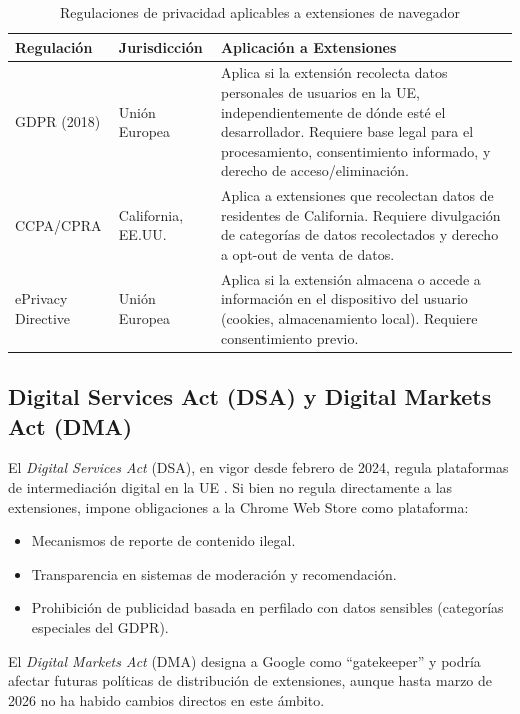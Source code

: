 \documentclass[12pt,oneside]{report}
\begin{document}
\begin{table}[!htbp]
\centering
\small
\begin{tabularx}{\textwidth}{|l|l|X|}
\hline
\textbf{Regulación} & \textbf{Jurisdicción} & \textbf{Aplicación a Extensiones} \\
\hline
GDPR (2018) & Unión Europea & Aplica si la extensión recolecta datos personales de usuarios en la UE, independientemente de dónde esté el desarrollador. Requiere base legal para el procesamiento, consentimiento informado, y derecho de acceso/eliminación. \\
\hline
CCPA/CPRA & California, EE.UU. & Aplica a extensiones que recolectan datos de residentes de California. Requiere divulgación de categorías de datos recolectados y derecho a opt-out de venta de datos. \\
\hline
ePrivacy Directive & Unión Europea & Aplica si la extensión almacena o accede a información en el dispositivo del usuario (cookies, almacenamiento local). Requiere consentimiento previo. \\
\hline
\end{tabularx}
\caption{Regulaciones de privacidad aplicables a extensiones de navegador}
\label{tab:privacy_regulations}
\end{table}

\subsection{Digital Services Act (DSA) y Digital Markets Act (DMA)}

El \textit{Digital Services Act} (DSA), en vigor desde febrero de 2024, regula plataformas de intermediación digital en la UE \cite{eu_dsa}. Si bien no regula directamente a las extensiones, impone obligaciones a la Chrome Web Store como plataforma:

\begin{itemize}
    \item Mecanismos de reporte de contenido ilegal.
    \item Transparencia en sistemas de moderación y recomendación.
    \item Prohibición de publicidad basada en perfilado con datos sensibles (categorías especiales del GDPR).
\end{itemize}

El \textit{Digital Markets Act} (DMA) designa a Google como ``gatekeeper'' y podría afectar futuras políticas de distribución de extensiones, aunque hasta marzo de 2026 no ha habido cambios directos en este ámbito.
\end{document}
